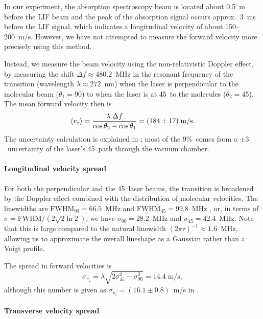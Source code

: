 In our experiment, the absorption spectroscopy beam is located about 0.5~m
before the \gls{LIF} beam and the peak of the absorption signal occurs approx.\
3~ms before the \gls{LIF} signal, which indicates a longitudinal velocity of
about 150--200~m/s. However, we have not attempted to measure the forward
velocity more precisely using this method.

Instead, we measure the beam velocity using the non-relativistic Doppler effect,
by measuring the shift $\Delta f\approx480.2$~MHz in the resonant frequency of
the transition (wavelength $\lambda\approx272$~nm) when the laser is
perpendicular to the molecular beam ($\theta_1=90$\deg) to when the laser is at
45\deg\ to the molecules ($\theta_2=45$\deg). The mean forward velocity then is
\cite[eqn~5.17]{timgren2023thesis}
%
\[
    \langle v_z\rangle=\frac{\lambda\;\Delta
    f}{\cos\theta_2-\cos\theta_1}=(184\pm17)\;\text{m/s}.
\]
%
The uncertainty calculation is explained in
\cite[sect~5.3.1]{timgren2023thesis}; most of the 9\%\ comes from a $\pm3$\deg\
uncertainty of the laser's 45\deg\ path through the vacuum chamber.

\paragraph{Longitudinal velocity spread}

For both the perpendicular and the 45\deg\ laser beams, the transition is
broadened by the Doppler effect combined with the distribution of molecular
velocities. The linewidths are $\text{FWHM}_{90}=66.5$~MHz and
$\text{FWHM}_{45}=99.8$~MHz \cite[Table~5.1]{timgren2023thesis}, or, in terms of
$\sigma=\text{FWHM}/(2\sqrt{2\ln2})$, we have $\sigma_{90}=28.2$~MHz and
$\sigma_{45}=42.4$~MHz. Note that this is large compared to the natural
linewidth $(2\pi\tau)^{-1}\approx1.6$~MHz, allowing us to approximate the
overall lineshape as a Gaussian rather than a Voigt profile.

The spread in forward velocities is \cite[eqn~5.27]{timgren2023thesis}
%
\begin{equation}
    \label{sigma_v_z}
    \sigma_{v_z}=\lambda\sqrt{2\sigma_{45}^2-\sigma_{90}^2}=14.4\;\text{m/s},
\end{equation}
%
although this number is given as $\sigma_{v_z}=(16.1\pm0.8)$~m/s in
\cite[eqn~5.34]{timgren2023thesis}.

\paragraph{Transverse velocity spread}

